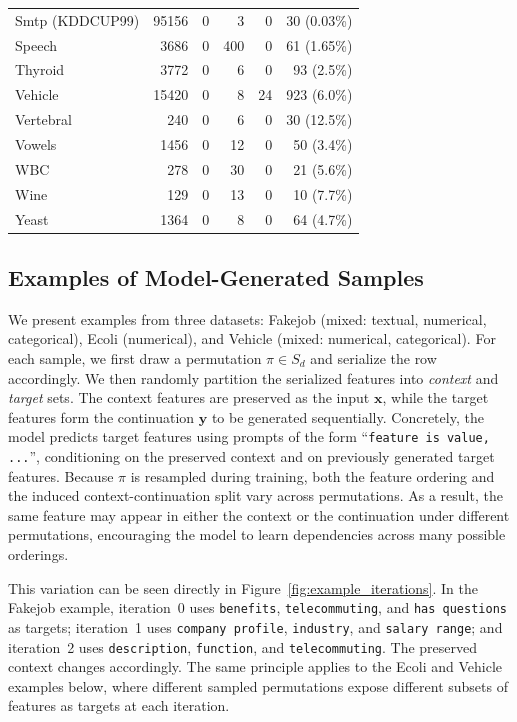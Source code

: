 \begin{table}[t]
\begin{tabular}{lrrrrr}
Smtp (KDDCUP99)   & 95156  & 0 & 3   & 0 & 30 (0.03\%)  \\
Speech            & 3686   & 0 & 400 & 0 & 61 (1.65\%)  \\
Thyroid           & 3772   & 0 & 6   & 0 & 93 (2.5\%)   \\
Vehicle & 15420  & 0 & 8   & 24 & 923 (6.0\%)  \\
Vertebral         & 240    & 0 & 6   & 0 & 30 (12.5\%)  \\
Vowels            & 1456   & 0 & 12  & 0 & 50 (3.4\%)   \\
WBC               & 278    & 0 & 30  & 0 & 21 (5.6\%)   \\
Wine              & 129    & 0 & 13  & 0 & 10 (7.7\%)   \\
Yeast             & 1364   & 0 & 8   & 0 & 64 (4.7\%)   \\
\bottomrule
\end{tabular}
\end{table}



\subsection{Examples of Model-Generated Samples}
\label{sec:app:examples}

We present examples from three datasets: Fakejob (mixed: textual, numerical, categorical), Ecoli (numerical), and Vehicle (mixed: numerical, categorical). For each sample, we first draw a permutation $\pi \in S_d$ and serialize the row accordingly. We then randomly partition the serialized features into \textit{context} and \textit{target} sets. The context features are preserved as the input $\boldsymbol{x}$, while the target features form the continuation $\boldsymbol{y}$ to be generated sequentially. Concretely, the model predicts target features using prompts of the form ``\texttt{feature is value, ...}'', conditioning on the preserved context and on previously generated target features. Because $\pi$ is resampled during training, both the feature ordering and the induced context-continuation split vary across permutations. As a result, the same feature may appear in either the context or the continuation under different permutations, encouraging the model to learn dependencies across many possible orderings.

This variation can be seen directly in Figure~\ref{fig:example_iterations}. In the Fakejob example, iteration~0 uses \texttt{benefits}, \texttt{telecommuting}, and \texttt{has questions} as targets; iteration~1 uses \texttt{company profile}, \texttt{industry}, and \texttt{salary range}; and iteration~2 uses \texttt{description}, \texttt{function}, and \texttt{telecommuting}. The preserved context changes accordingly. The same principle applies to the Ecoli and Vehicle examples below, where different sampled permutations expose different subsets of features as targets at each iteration.


